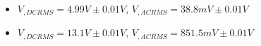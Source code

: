 \begin{itemize}
     \item $V_{, DCRMS}=4.99V\pm 0.01\unit{V}$, $V_{, ACRMS}=38.8mV\pm 0.01\unit{V}$ 
     \item $V_{, DCRMS}=13.1V\pm 0.01\unit{V}$, $V_{, ACRMS}=851.5mV\pm 0.01\unit{V}$\\
\end{itemize}